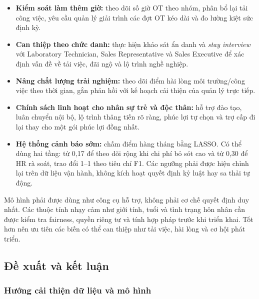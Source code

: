 \begin{itemize}
  \item \textbf{Kiểm soát làm thêm giờ:} theo dõi số giờ OT theo nhóm,
  phân bổ lại tải công việc, yêu cầu quản lý giải trình các đợt OT kéo
  dài và đo lường kiệt sức định kỳ.
  \item \textbf{Can thiệp theo chức danh:} thực hiện khảo sát ẩn danh và
  \emph{stay interview} với Laboratory Technician, Sales Representative
  và Sales Executive để xác định vấn đề về tải việc, đãi ngộ và lộ trình
  nghề nghiệp.
  \item \textbf{Nâng chất lượng trải nghiệm:} theo dõi điểm hài lòng
  môi trường/công việc theo thời gian, gắn phản hồi với kế hoạch cải thiện
  của quản lý trực tiếp.
  \item \textbf{Chính sách linh hoạt cho nhân sự trẻ và độc thân:} hỗ
  trợ đào tạo, luân chuyển nội bộ, lộ trình thăng tiến rõ ràng, phúc lợi
  tự chọn và trợ cấp đi lại thay cho một gói phúc lợi đồng nhất.
  \item \textbf{Hệ thống cảnh báo sớm:} chấm điểm hàng tháng bằng LASSO.
  Có thể dùng hai tầng: từ 0,17 để theo dõi rộng khi chi phí bỏ sót cao
  và từ 0,30 để HR rà soát, trao đổi 1--1 theo tiêu chí F1. Các ngưỡng
  phải được hiệu chỉnh lại trên dữ liệu vận hành, không kích hoạt quyết
  định kỷ luật hay sa thải tự động.
\end{itemize}

Mô hình phải được dùng như công cụ hỗ trợ, không phải cơ chế quyết định
duy nhất. Các thuộc tính nhạy cảm như giới tính, tuổi và tình trạng hôn
nhân cần được kiểm tra fairness, quyền riêng tư và tính hợp pháp trước
khi triển khai. Tốt hơn nên ưu tiên các biến có thể can thiệp như tải
việc, hài lòng và cơ hội phát triển.

\subsection{Đề xuất và kết luận}

\subsubsection{Hướng cải thiện dữ liệu và mô hình}

